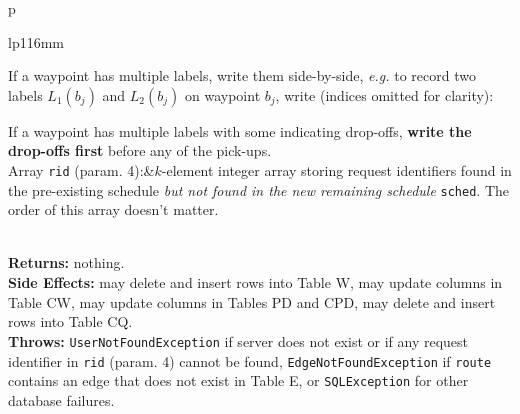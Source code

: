 \begin{tabular}{p{\textwidth}}
\begin{tabular}{lp{116mm}}

If a waypoint has multiple labels, write them side-by-side, \textit{e.g.}
to record two labels $L_1(b_j)$ and $L_2(b_j)$ on waypoint $b_j$, write
(indices omitted for clarity):


If a waypoint has multiple labels with some indicating drop-offs, \textbf{write
the drop-offs first} before any of the pick-ups.\\
Array {\tt{}rid} (param. 4):&$k$-element integer array storing request
identifiers found in the pre-existing schedule \emph{but not found in the new
remaining schedule} {\tt{}sched}. The order of this array doesn't matter.
\end{tabular}\\
\textbf{Returns:} nothing.\\
\textbf{Side Effects:} may delete and insert rows into Table W, may
update columns in Table CW, may update columns in Tables PD and CPD,
may delete and insert rows into Table CQ.\\
\textbf{Throws:} {\tt{}UserNotFoundException} if server does not exist or if any
request identifier in {\tt{}rid} (param. 4) cannot be found,
{\tt{}EdgeNotFoundException} if {\tt{}route} contains an edge that does not exist in
Table E, or {\tt{}SQLException} for other database failures.\\
\bottomrule
\end{tabular}
\nwenddocs{}\endmoddef{}
